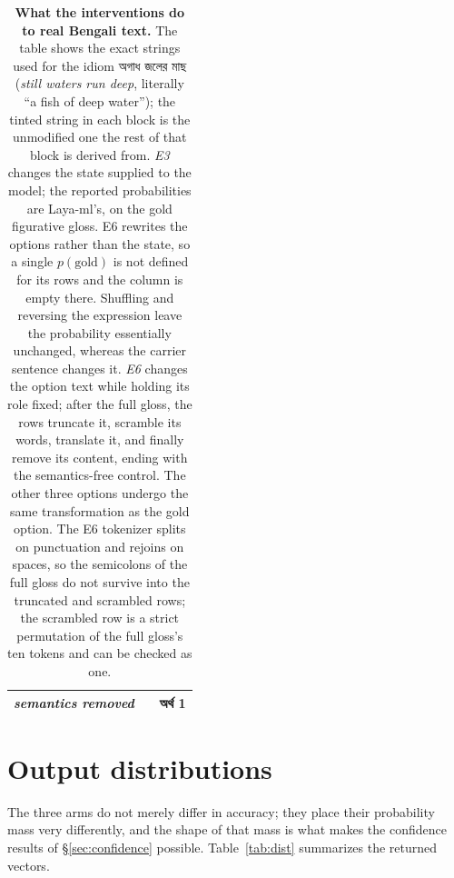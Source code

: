 \documentclass[11pt]{article}
\newcommand{\bangla}[1]{{\bn #1}}
\newcommand{\hlG}[1]{{\setlength{\fboxsep}{1.6pt}\colorbox{fGrey}{#1}}}
\begin{document}
\begin{table}[t]
\begin{tabularx}{\textwidth}{
    @{}
    >{\raggedright\arraybackslash}p{3.45cm}
    >{\centering\arraybackslash}p{1.35cm}
    >{\raggedright\arraybackslash}X
}
\textit{semantics removed}
&
&
\hlG{\bangla{অর্থ} 1}
\\

\bottomrule
\end{tabularx}

\caption{\textbf{What the interventions do to real Bengali text.}
The table shows the exact strings used for the idiom
\bangla{অগাধ জলের মাছ} (\emph{still waters run deep}, literally
``a fish of deep water''); the tinted string in each block is the unmodified one
the rest of that block is derived from. \emph{E3} changes the state supplied to
the model; the reported probabilities are Laya-ml's, on the gold figurative
gloss. E6 rewrites the options rather than the state, so a single
$p(\text{gold})$ is not defined for its rows and the column is empty there. Shuffling and reversing the
expression leave the probability essentially unchanged, whereas the
carrier sentence changes it. \emph{E6} changes the option text while
holding its role fixed; after the full gloss, the rows truncate it, scramble its
words, translate it, and finally remove its content, ending with the semantics-free
control.
The other three options undergo the same transformation as the gold
option. The E6 tokenizer splits on punctuation and rejoins on spaces, so the
semicolons of the full gloss do not survive into the truncated and scrambled
rows; the scrambled row is a strict permutation of the full gloss's ten tokens
and can be checked as one.}

\label{tab:bnmanip}
\end{table}




\section{Output distributions}
\label{app:dists}

The three arms do not merely differ in accuracy; they place their probability
mass very differently, and the shape of that mass is what makes the confidence
results of \S\ref{sec:confidence} possible. Table~\ref{tab:dist} summarizes the
returned vectors.
\end{document}
